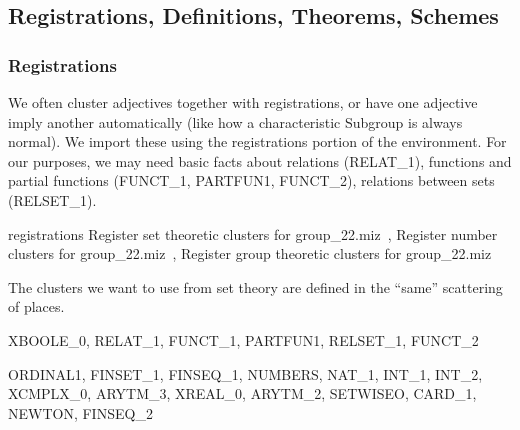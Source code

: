 \subsection{Registrations, Definitions, Theorems, Schemes}

\subsubsection{Registrations}
We often cluster adjectives together with registrations, or have one
adjective imply another automatically (like how a characteristic
Subgroup is always normal). We import these using the registrations
portion of the environment. For our purposes, we may need basic facts
about relations ({\Tt{}RELAT{\_}1\nwendquote}), functions and partial functions ({\Tt{}FUNCT{\_}1\nwendquote},
{\Tt{}PARTFUN1\nwendquote}, {\Tt{}FUNCT{\_}2\nwendquote}), relations between sets ({\Tt{}RELSET{\_}1\nwendquote}).

\nwenddocs{}\endmoddef\nwstartdeflinemarkup{}\nwenddeflinemarkup
registrations \LA{}Register set theoretic clusters for \code{}group{\_}22.miz\edoc{}~{\nwtagstyle{}}\RA{},
  \LA{}Register number clusters for \code{}group{\_}22.miz\edoc{}~{\nwtagstyle{}}\RA{},
  \LA{}Register group theoretic clusters for \code{}group{\_}22.miz\edoc{}~{\nwtagstyle{}}\RA{}
\nwendcode{}\nwdocspar

The clusters we want to use from set theory are defined in the ``same''
scattering of places.

\nwenddocs{}\endmoddef\nwstartdeflinemarkup{}\nwenddeflinemarkup
XBOOLE_0, RELAT_1, FUNCT_1, PARTFUN1, RELSET_1, FUNCT_2
\nwendcode{}\nwdocspar

\nwenddocs{}\endmoddef\nwstartdeflinemarkup{}\nwenddeflinemarkup
ORDINAL1, FINSET_1, FINSEQ_1, NUMBERS, NAT_1, INT_1, INT_2, XCMPLX_0,
ARYTM_3, XREAL_0, ARYTM_2, SETWISEO, CARD_1, NEWTON, FINSEQ_2
\nwendcode{}\nwdocspar

